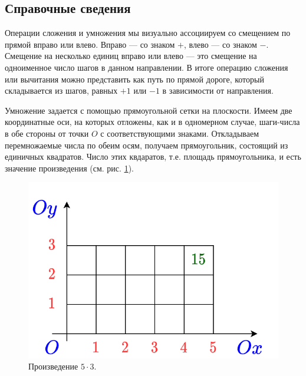 \subsection*{Справочные сведения}

Операции сложения и умножения мы визуально ассоциируем со смещением по прямой вправо или влево. Вправо --- со знаком $+$, влево --- со знаком $-$. Смещение на несколько единиц вправо или влево --- это смещение на одноименное число шагов в данном направлении. В итоге операцию сложения или вычитания можно представить как путь по прямой дороге, который складывается из шагов, равных $+1$ или $-1$ в зависимости от направления.

Умножение задается с помощью прямоугольной сетки на плоскости. Имеем две координатные оси, на которых отложены, как и в одномерном случае, шаги-числа в обе стороны от точки $O$ с соответствующими знаками. Откладываем перемножаемые числа по обеим осям, получаем прямоугольник, состоящий из единичных квадратов. Число этих квдаратов, т.е. площадь прямоугольника, и есть значение произведения (см. рис. \ref{prod}).
\begin{figure}[hbt!]
\begin{center}
\includegraphics[scale=0.2]{../prod.png}
\end{center}
\caption{Произведение $5\cdot 3$.}\label{prod}
\end{figure}

